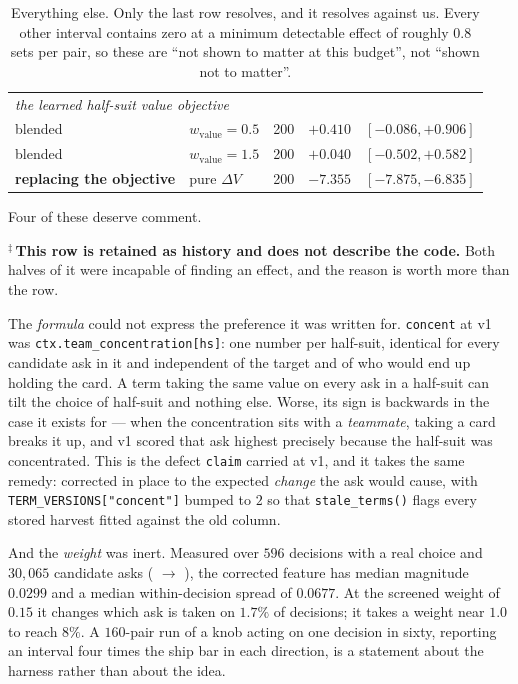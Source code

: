 \documentclass[11pt,letterpaper]{article}
\begin{document}
\begin{table}[t]
\begin{tabular}{llrrl}
\midrule
\multicolumn{5}{l}{\emph{the learned half-suit value objective}}\\
blended & $w_{\mathrm{value}} = 0.5$ & 200 & $+0.410$ & $[-0.086, +0.906]$ \\
blended & $w_{\mathrm{value}} = 1.5$ & 200 & $+0.040$ & $[-0.502, +0.582]$ \\
\textbf{replacing the objective} & pure $\Delta V$ & 200 & $\mathbf{-7.355}$ & $[-7.875, -6.835]$ \\
\bottomrule
\end{tabular}
\caption{Everything else. Only the last row resolves, and it resolves against
us. Every other interval contains zero at a minimum detectable effect of
roughly $0.8$ sets per pair, so these are ``not shown to matter at this budget'',
not ``shown not to matter''.}
\label{tab:nulls}
\end{table}

Four of these deserve comment.

$^\ddagger$\,\textbf{This row is retained as history and does not describe the
code.} Both halves of it were incapable of finding an effect, and the reason is
worth more than the row.

The \emph{formula} could not express the preference it was written for.
\texttt{concent} at v1 was \texttt{ctx.team\_\allowbreak concentration[hs]}: one number per
half-suit, identical for every candidate ask in it and independent of the
target and of who would end up holding the card. A term taking the same value
on every ask in a half-suit can tilt the choice of half-suit and nothing else.
Worse, its sign is backwards in the case it exists for --- when the
concentration sits with a \emph{teammate}, taking a card breaks it up, and v1
scored that ask highest precisely because the half-suit was concentrated. This
is the defect \texttt{claim} carried at v1, and it takes the same remedy:
corrected in place to the expected \emph{change} the ask would cause, with
\texttt{TERM\_VERSIONS["concent"]} bumped to $2$ so that
\texttt{stale\_terms()} flags every stored harvest fitted against the old
column.

And the \emph{weight} was inert. Measured over $596$ decisions with a real
choice and $30{,}065$ candidate asks
( $\rightarrow$
), the corrected feature has median magnitude
$0.0299$ and a median within-decision spread of $0.0677$. At the screened
weight of $0.15$ it changes which ask is taken on $1.7\%$ of decisions; it
takes a weight near $1.0$ to reach $8\%$. A $160$-pair run of a knob acting on
one decision in sixty, reporting an interval four times the ship bar in each
direction, is a statement about the harness rather than about the idea.
\end{document}
